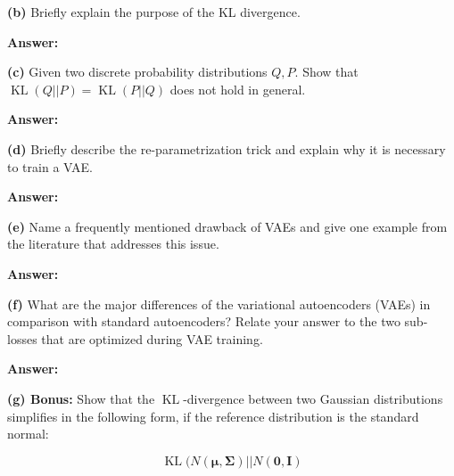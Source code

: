 
\textbf{(b)} Briefly explain the purpose of the KL divergence.

\textbf{Answer:}


\textbf{(c)} Given two discrete probability distributions $Q, P$. Show that $\operatorname{KL}(Q || P) = \operatorname{KL}(P || Q)$ does not hold in general.

\textbf{Answer:}




\textbf{(d)} Briefly describe the re-parametrization trick and explain why it is necessary to train a VAE.

\textbf{Answer:}


\textbf{(e)} Name a frequently mentioned drawback of VAEs and give one example from the literature that addresses this issue.

\textbf{Answer:}


\textbf{(f)} What are the major differences of the variational autoencoders (VAEs) in comparison with standard autoencoders? Relate your answer to the two sub-losses that are optimized during VAE training.

\textbf{Answer:}


\textbf{(g) Bonus:} Show that the $\operatorname{KL}$-divergence between two Gaussian distributions simplifies in the following form, if the reference distribution is the standard normal:

\begin{equation}
	\operatorname{KL}(N(\mathbf{\mu}, \mathbf{\Sigma})|| N(\mathbf{0}, \mathbf{I})
\end{equation}

